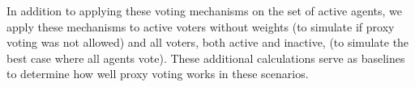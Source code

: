In addition to applying these voting mechanisms on the set of active agents, we
apply these mechanisms to active voters without weights (to simulate if proxy voting was
not allowed) and all voters, both active and inactive, (to simulate the best case
where all agents vote).
These additional calculations serve as baselines to determine how well proxy voting
works in these scenarios.

